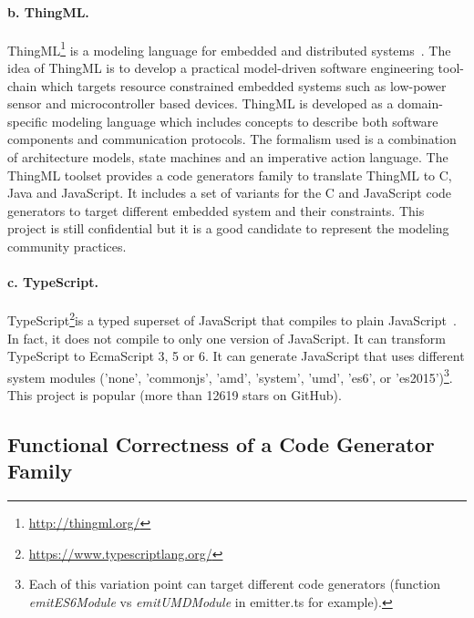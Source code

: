 \paragraph{b. ThingML.} ThingML\footnote{\url{http://thingml.org/}} is a modeling language for embedded and distributed systems~\cite{fleurey2011mde}. The idea of ThingML is to develop a practical model-driven software engineering tool-chain which targets resource constrained embedded systems such as low-power sensor and microcontroller based devices. ThingML is developed as a domain-specific modeling language which includes concepts to describe both software components and communication protocols. The formalism used is a combination of architecture models, state machines and an imperative action language. The ThingML toolset provides a  code generators family  to translate ThingML to C, Java and JavaScript. It includes a set of variants for the C and JavaScript code generators to target different embedded system and their constraints. 
This project is still confidential but it is a good candidate to represent the modeling community practices.
 
\paragraph{c. TypeScript.} TypeScript\footnote{\url{https://www.typescriptlang.org/}}is a typed superset of JavaScript that compiles to plain JavaScript~\cite{rastogi2015safe}. In fact, it does not compile to only one version of JavaScript. It can transform TypeScript to EcmaScript 3, 5 or 6. It can generate JavaScript that uses different system modules ('none', 'commonjs', 'amd', 'system', 'umd', 'es6', or 'es2015')\footnote{Each of this variation point can target different code generators (function \textit{emitES6Module} vs \textit{emitUMDModule} in emitter.ts for example).}. 
This project is popular (more than \num{12619} stars on GitHub).


\subsection{Functional Correctness of a Code Generator Family}


